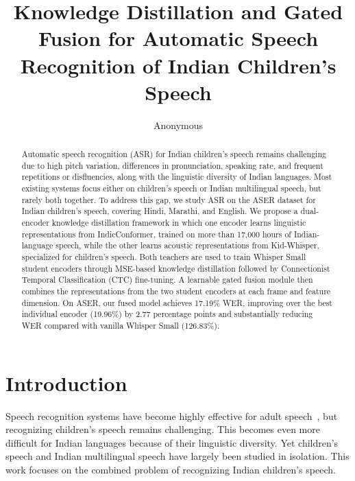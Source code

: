 \documentclass{article} %
\title{Knowledge Distillation and Gated Fusion for Automatic Speech Recognition of Indian Children's Speech}
\author{Anonymous}
\begin{document}
\maketitle

\begin{abstract}
Automatic speech recognition (ASR) for Indian children's speech remains challenging due to high pitch variation, differences in pronunciation, speaking rate, and frequent repetitions or disfluencies, along with the linguistic diversity of Indian languages. Most existing systems focus either on children's speech or Indian multilingual speech, but rarely both together. To address this gap, we study ASR on the ASER dataset for Indian children's speech, covering Hindi, Marathi, and English. We propose a dual-encoder knowledge distillation framework in which one encoder learns linguistic representations from IndicConformer, trained on more than 17,000 hours of Indian-language speech, while the other learns acoustic representations from Kid-Whisper, specialized for children's speech. Both teachers are used to train Whisper Small student encoders through MSE-based knowledge distillation followed by Connectionist Temporal Classification (CTC) fine-tuning. A learnable gated fusion module then combines the representations from the two student encoders at each frame and feature dimension. On ASER, our fused model achieves 17.19\% WER, improving over the best individual encoder (19.96\%) by 2.77 percentage points and substantially reducing WER compared with vanilla Whisper Small (126.83\%).
\end{abstract}

\section{Introduction}
\label{sec:intro}

Speech recognition systems have become highly effective for adult speech~\citep{radford2023whisper}, but recognizing children's speech remains challenging. This becomes even more difficult for Indian languages because of their linguistic diversity. Yet children's speech and Indian multilingual speech have largely been studied in isolation. This work focuses on the combined problem of recognizing Indian children's speech.
\end{document}
